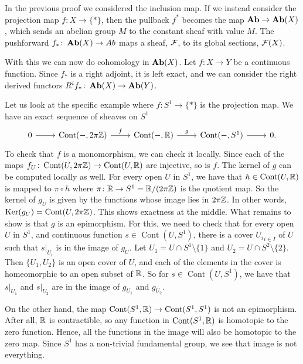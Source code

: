 \documentclass{article}
\DeclareMathOperator{\Cont}{Cont}
\begin{document}
In the previous proof we considered the inclusion map.
If we instead consider the projection map $f\colon X \to \{*\}$,
then the pullback $f^*$ becomes the map $\operatorname{\mathbf{Ab}} \to \operatorname{\mathbf{Ab}}(X)$,
which sends an abelian group $M$ to the constant sheaf with
value $M$. The pushforward $f_*\colon \operatorname{\mathbf{Ab}}(X) \to Ab$ maps
a sheaf, $\mathcal{F}$, to its global sections, $\mathcal{F}(X)$.

With this we can now do cohomology in $\operatorname{\mathbf{Ab}}(X)$.
Let $f\colon X \to Y$ be a continuous function.
Since $f_*$ is a right adjoint, it is left exact, and
we can consider the right derived functors $R^if_* \colon \operatorname{\mathbf{Ab}}(X) \to \operatorname{\mathbf{Ab}}(Y)$.

\begin{example}
    Let us look at the specific example where $f \colon S^1 \to \{*\}$
    is the projection map. We have an exact sequence of sheaves on $S^1$
    \begin{equation*}
        \begin{tikzcd}
            0 \rar & \Cont(-, 2\pi \bbZ) \rar["f"] & \Cont(-, \bbR)
            \rar["g"] & \Cont(-, S^1) \rar & 0.
        \end{tikzcd}
    \end{equation*}
    To check that $f$ is a monomorphism, we can check it locally. Since
    each of the maps $f_U \colon \Cont(U, 2\pi \bbZ) \to \Cont(U, \bbR)$ are injective,
    so is $f$. The kernel of $g$ can be computed locally as well.
    For every open $U$ in $S^1$, we have that $h \in \Cont(U, \bbR)$ is
    mapped to $\pi \circ h$ where $\pi \colon \mathbb{R} \to S^1 = \mathbb{R} / (2\pi \mathbb{Z})$
    is the quotient map. So the kernel of $g_U$ is given by the functions
    whose image lies in $2\pi \mathbb{Z}$. In other words, $\Ker(g_U) = \Cont(U, 2\pi \bbZ)$.
    This shows exactness at the middle. What remains to show is that $g$ is an
    epimorphism. For this, we need to check that for every open $U$ in $S^1$,
    and continuous function $s \in \Cont(U, S^1)$, there is a cover ${U_i}_{i\in I}$
    of $U$ such that $s|_{U_i}$ is in the image of $g_U$. Let $U_1 = U \cap S^1 \setminus \{1\} $
    and $U_2 = U \cap S^2 \setminus \{2\}$. Then $\{U_1,U_2\}$ is an open cover
    of $U$, and each of the elements in the cover is homeomorphic to an open subset of $\mathbb{R}$.
    So for $s\in \Cont(U, S^1)$, we have that $s|_{U_1}$ and $s|_{U_2}$
    are in the image of $g_{U_1}$ and $g_{U_2}$.

    On the other hand, the map $\Cont(S^1 , \bbR) \to \Cont(S^1, S^1)$ is
    not an epimorphism. After all, $\mathbb{R}$ is contractible, so any
    function in $\Cont(S^1, \bbR)$ is homotopic to the zero function. Hence,
    all the functions in the image will also be homotopic to the zero map.
    Since $S^1$ has a non-trivial fundamental group, we see that image
    is not everything.


\end{example}
\end{document}
